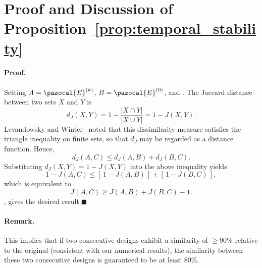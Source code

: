\documentclass[a4paper,fleqn]{cas-sc}
\begin{document}
\printcredits

%






\newpage
\appendix


\section{Proof and Discussion of Proposition~\ref{prop:temporal_stability}}
\label{app:temporal_stability_proof}

\paragraph{Proof.}
Setting $A=\pazocal{E}^{(k)}$, $B=\pazocal{E}^{(0)}$, and .
The Jaccard distance between two sets $X$ and $Y$ is
\[
d_J(X,Y)=1-\frac{|X\cap Y|}{|X\cup Y|}=1-J(X,Y).
\]
Levandowsky and Winter~\citep{levandowsky1971distance} noted that this
dissimilarity measure satisfies the triangle inequality on finite sets,
so that $d_J$ may be regarded as a distance function. Hence,
\[
d_J(A,C)\le d_J(A,B)+d_J(B,C).
\]
Substituting $d_J(X,Y)=1-J(X,Y)$ into the above inequality yields
\[
1-J(A,C)
\le [\,1-J(A,B)\,]+[\,1-J(B,C)\,],
\]
which is equivalent to
\[
J(A,C)\ge J(A,B)+J(B,C)-1.
\]
, gives the desired result.\hfill$\blacksquare$

\paragraph{Remark.}
This implies that if two consecutive designs exhibit a similarity of $\geq 90\%$ relative to the original (consistent with our numerical results), the similarity between these two consecutive designs is guaranteed to be at least 80\%.
\end{document}
